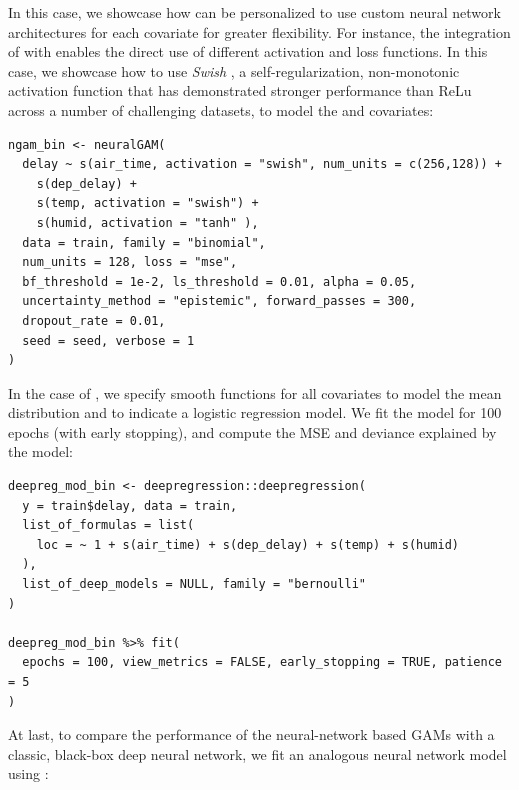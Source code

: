 In this case, we showcase how  can be personalized to use custom neural network architectures for each covariate for greater flexibility. For instance, the integration of  with  enables the direct use of different activation and loss functions. In this case, we showcase how to use \emph{Swish} \citep{ramachandran2017searching}, a self-regularization, non-monotonic activation function that has demonstrated stronger performance than ReLu across a number of challenging datasets, to model the  and  covariates:

\begin{Verbatim}
ngam_bin <- neuralGAM(
  delay ~ s(air_time, activation = "swish", num_units = c(256,128)) +
    s(dep_delay) +
    s(temp, activation = "swish") +
    s(humid, activation = "tanh" ),
  data = train, family = "binomial",
  num_units = 128, loss = "mse",
  bf_threshold = 1e-2, ls_threshold = 0.01, alpha = 0.05,
  uncertainty_method = "epistemic", forward_passes = 300,
  dropout_rate = 0.01,
  seed = seed, verbose = 1
)
\end{Verbatim}

In the case of , we specify smooth functions for all covariates to model the mean distribution and  to indicate a logistic regression model. We fit the model for 100 epochs (with early stopping), and compute the MSE and deviance explained by the model: 

\begin{Verbatim}
deepreg_mod_bin <- deepregression::deepregression(
  y = train$delay, data = train,
  list_of_formulas = list(
    loc = ~ 1 + s(air_time) + s(dep_delay) + s(temp) + s(humid)
  ),
  list_of_deep_models = NULL, family = "bernoulli"
)

deepreg_mod_bin %>% fit(
  epochs = 100, view_metrics = FALSE, early_stopping = TRUE, patience = 5
)
\end{Verbatim}

At last, to compare the performance of the neural-network based GAMs with a classic, black-box deep neural network, we fit an analogous neural network model using :

